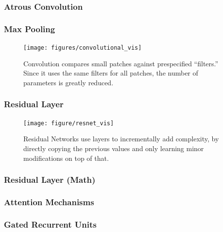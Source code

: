 \documentclass[10pt,mathserif]{beamer}
\begin{document}
\begin{frame}
  \frametitle{Atrous Convolution}
\end{frame}

\begin{frame}
  \frametitle{Max Pooling}
  \begin{figure}
    \centering
    \texttt{[image: figures/convolutional\_vis]}
    \caption{Convolution compares small patches against prespecified
      ``filters.'' Since it uses the same filters for all patches, the number of
      parameters is greatly reduced.
      \label{fig:convolutional_vis}}
  \end{figure}
\end{frame}

\begin{frame}
  \frametitle{Residual Layer}
  \begin{figure}
      \centering
      \texttt{[image: figure/resnet\_vis]}
      \caption{Residual Networks use layers to incrementally
        add complexity, by directly copying the previous values and only
        learning minor modifications on top of that. \label{fig:resnet_vis} }
  \end{figure}
\end{frame}

\begin{frame}
  \frametitle{Residual Layer (Math)}
\end{frame}

\begin{frame}
  \frametitle{Attention Mechanisms}
\end{frame}

\begin{frame}
  \frametitle{Gated Recurrent Units}
\end{frame}
\end{document}
